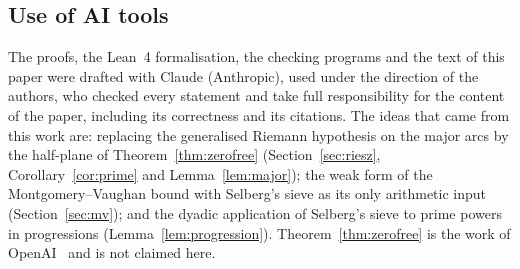 \documentclass{aomart}
\numberwithin{equation}{section}
\theoremstyle{definition}
\begin{document}
\subsection*{Use of AI tools}
The proofs, the Lean~4 formalisation, the checking programs and the text of this paper were
drafted with Claude (Anthropic), used under the direction of the authors, who checked every
statement and take full responsibility for the content of the paper, including its correctness
and its citations. The ideas that came from this work are: replacing the generalised Riemann
hypothesis on the major arcs by the half-plane of Theorem~\ref{thm:zerofree}
(Section~\ref{sec:riesz}, Corollary~\ref{cor:prime} and Lemma~\ref{lem:major}); the weak form of
the Montgomery--Vaughan bound with Selberg's sieve as its only arithmetic input
(Section~\ref{sec:mv}); and the dyadic application of Selberg's sieve to prime powers in
progressions (Lemma~\ref{lem:progression}). Theorem~\ref{thm:zerofree} is the work of
OpenAI~\cite{OAI26} and is not claimed here.
\end{document}
